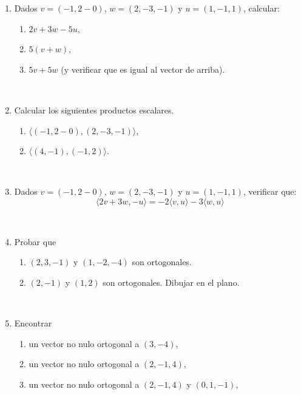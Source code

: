 \documentclass[11pt,spanish,makeidx,reqno]{amsbook}
\begin{document}
\begin{enumerate}


\item Dados $v = (-1, 2-0)$, $w = (2,-3,-1)$ y $u = (1,-1,1)$, calcular:
\begin{enumerate}
	\item $2v + 3w -5u$,
	\item $5(v+w)$, 
	\item $5v + 5w$ (y verificar que es igual al vector de arriba).
\end{enumerate}

\

\item Calcular los siguientes productos escalares. %
\begin{enumerate}
  \item $\langle (-1, 2-0) ,(2,-3,-1) \rangle$, 
  \item  $\langle (4,-1),(-1,2) \rangle$.
\end{enumerate}

\

\item Dados $v = (-1, 2-0)$, $w = (2,-3,-1)$  y $u = (1,-1,1)$, verificar que:
\begin{equation*}
	\langle 2v + 3w , -u   \rangle = -2\langle v ,u \rangle -3 \langle w , u  \rangle
\end{equation*}

\ 

\item Probar  que 
\begin{enumerate}
	\item $(2,3,-1)$ y $(1, -2, -4)$ son ortogonales.
	\item $(2,-1)$ y $(1,2)$ son ortogonales. Dibujar en el plano. 
\end{enumerate}
\ 

\item Encontrar 
\begin{enumerate}
	\item un vector no nulo ortogonal  a $(3,-4)$,
	\item un vector no nulo ortogonal a $(2,-1,4)$,
	\item un vector no nulo ortogonal a $(2,-1,4)$ y $(0,1,-1)$,
\end{enumerate}


\end{enumerate}
\end{document}
